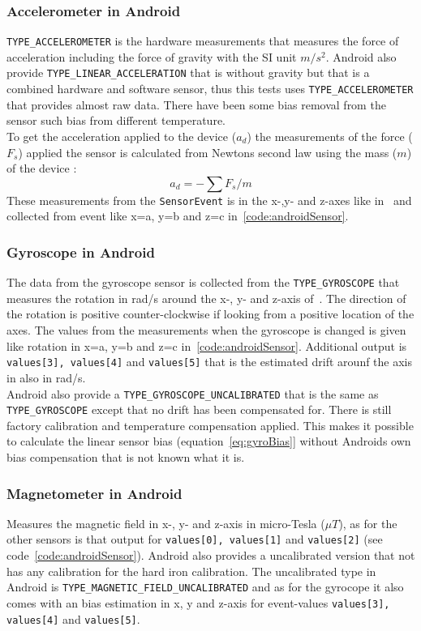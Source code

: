 \subsubsection{Accelerometer in Android}\label{subsec:accAndroid}
\texttt{TYPE\_ACCELEROMETER} is the hardware measurements that measures the force of acceleration including the force of gravity with the SI unit $m/s^2$. Android also provide \texttt{TYPE\_LINEAR\_ACCELERATION} that is without gravity but that is a combined hardware and software sensor, thus this tests uses  \texttt{TYPE\_ACCELEROMETER} that provides almost raw data. There have been some bias removal from the sensor such bias from different temperature. \\
To get the acceleration applied to the device ($a_d$) the measurements of the force ($F_s$) applied the sensor is calculated from Newtons second law using the mass ($m$) of the device :
$$a_d=-\sum F_s / m $$ 
These measurements from the \texttt{SensorEvent} is in the x-,y- and z-axes like in~ and collected from event like x=a, y=b and z=c in~\ref{code:androidSensor}. \cite[]{android:sensorEvent}


\subsubsection{Gyroscope in Android}\label{subsec:gyroAndroid}
The data from the gyroscope sensor is collected from the \texttt{TYPE\_GYROSCOPE} that measures the rotation in rad/s around the x-, y- and z-axis of~. The direction of the rotation is positive counter-clockwise if looking from a positive location of the axes. The values from the measurements when the gyroscope is changed is given like rotation in x=a, y=b and z=c in~\ref{code:androidSensor}. Additional output is \texttt{values[3], values[4]} and \texttt{values[5]} that is the estimated drift arounf the axis in also in rad/s.\\
Android also provide a \texttt{TYPE\_GYROSCOPE\_UNCALIBRATED} that is the same as \texttt{TYPE\_GYROSCOPE} except that no drift has been compensated for. There is still factory calibration and temperature compensation applied. \cite[]{android:sensorEvent} This makes it possible to calculate the linear sensor bias (equation~\ref{eq:gyroBias}] without Androids own bias compensation that is not known what it is.



\subsubsection{Magnetometer in Android}\label{subsec:magnAndroid}
Measures the magnetic field in x-, y- and z-axis in micro-Tesla ($\mu T$), as for the other sensors is that output for \texttt{values[0], values[1]} and \texttt{values[2]} (see code~\ref{code:androidSensor}). Android also provides a uncalibrated version that not has any calibration for the hard iron calibration. The uncalibrated type in Android is \texttt{TYPE\_MAGNETIC\_FIELD\_UNCALIBRATED} and as for the gyrocope it also comes with an bias estimation in x, y and z-axis for event-values \texttt{values[3], values[4]} and \texttt{values[5]}. 

